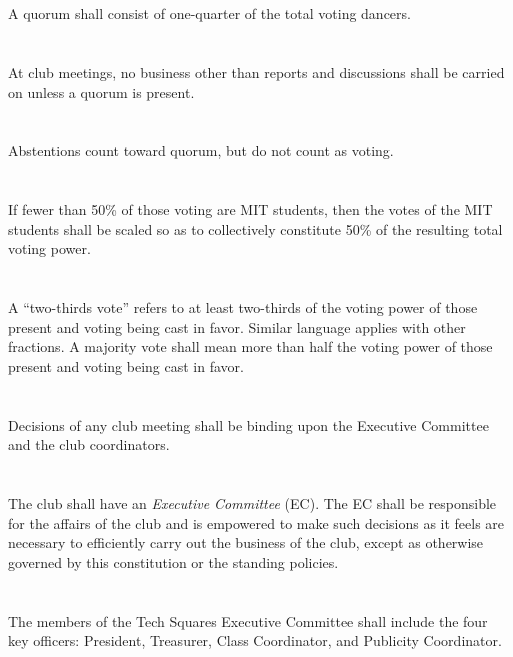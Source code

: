 \documentclass{bylaws}
\begin{document}
\section{}A quorum shall consist of one-quarter of the total voting dancers.
\section{}At club meetings, no business other than reports and discussions shall be carried on unless a quorum is present.
\section{}Abstentions count toward quorum, but do not count as voting.
\section{}If fewer than 50\% of those voting are MIT students, then the votes of the MIT students shall be scaled so as to collectively constitute 50\% of the resulting total voting power.
\section{}A ``two-thirds vote'' refers to at least two-thirds of the voting power of those present and voting being cast in favor. Similar language applies with other fractions. A majority vote shall mean more than half the voting power of those present and voting being cast in favor.
\section{}Decisions of any club meeting shall be binding upon the Executive Committee and the club coordinators.



\section{}The club shall have an \textit{Executive Committee} (EC). The EC shall be responsible for the affairs of the club and is empowered to make such decisions as it feels are necessary to efficiently carry out the business of the club, except as otherwise governed by this constitution or the standing policies.
\section{}The members of the Tech Squares Executive Committee shall include the four key officers: President, Treasurer, Class Coordinator, and Publicity Coordinator.
\end{document}
